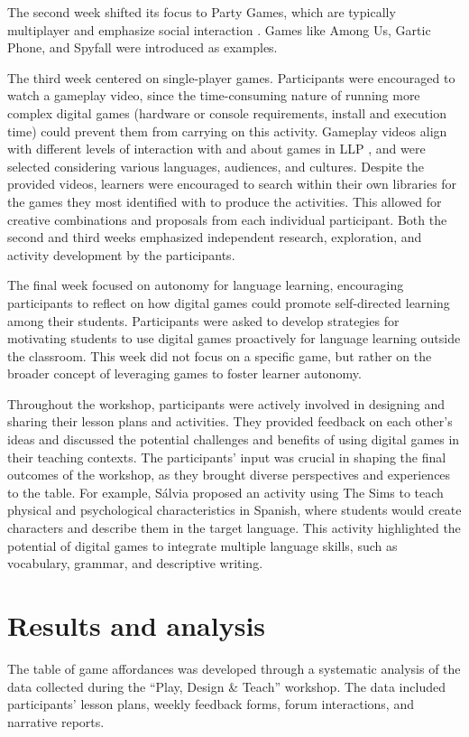 \documentclass[english]{textolivre}
\begin{document}
The second week shifted its focus to Party Games, which are typically multiplayer and emphasize social interaction \cite{oliveira2013videogames}. Games like Among Us, Gartic Phone, and Spyfall were introduced as examples.

The third week centered on single-player games. Participants were encouraged to watch a gameplay video, since the time-consuming nature of running more complex digital games (hardware or console requirements, install and execution time) could prevent them from carrying on this activity. Gameplay videos align with different levels of interaction with and about games in LLP \cite{york2021playing}, and were selected considering various languages, audiences, and cultures. Despite the provided videos, learners were encouraged to search within their own libraries for the games they most identified with to produce the activities. This allowed for creative combinations and proposals from each individual participant. Both the second and third weeks emphasized independent research, exploration, and activity development by the participants.

The final week focused on autonomy for language learning, encouraging participants to reflect on how digital games could promote self-directed learning among their students. Participants were asked to develop strategies for motivating students to use digital games proactively for language learning outside the classroom. This week did not focus on a specific game, but rather on the broader concept of leveraging games to foster learner autonomy.

Throughout the workshop, participants were actively involved in designing and sharing their lesson plans and activities. They provided feedback on each other’s ideas and discussed the potential challenges and benefits of using digital games in their teaching contexts. The participants’ input was crucial in shaping the final outcomes of the workshop, as they brought diverse perspectives and experiences to the table. For example, Sálvia proposed an activity using The Sims to teach physical and psychological characteristics in Spanish, where students would create characters and describe them in the target language. This activity highlighted the potential of digital games to integrate multiple language skills, such as vocabulary, grammar, and descriptive writing.

\section{Results and analysis}\label{sec-fmt-manuscrito}
The table of game affordances was developed through a systematic analysis of the data collected during the “Play, Design \& Teach” workshop. The data included participants’ lesson plans, weekly feedback forms, forum interactions, and narrative reports.
\end{document}

